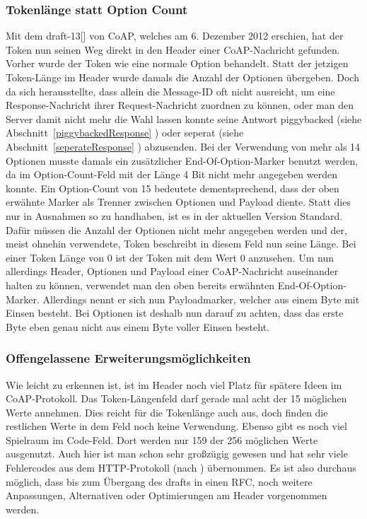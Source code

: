 \subsubsection{Tokenlänge statt Option Count}
Mit dem draft-13[\cite{draft-ietf-core-coap-13}] von CoAP, welches am 6. Dezember 2012 erschien, hat der Token nun seinen Weg direkt in
den Header einer \ac{CoAP}-Nachricht gefunden.
Vorher wurde der Token wie eine normale Option behandelt.
Statt der jetzigen Token-Länge im Header wurde damals die Anzahl der Optionen
übergeben.
Doch da sich herausstellte, dass allein die Message-ID oft nicht ausreicht, um
eine Response-Nachricht ihrer Request-Nachricht zuordnen zu können, oder man den
Server damit nicht mehr die Wahl lassen konnte seine Antwort piggybacked (siehe
Abschnitt~\ref{piggybackedResponse} ) oder seperat
(siehe Abschnitt~\ref{seperateResponse} ) abzusenden.
Bei der Verwendung von mehr als 14 Optionen musste
damals ein zusätzlicher End-Of-Option-Marker benutzt werden, da im
Option-Count-Feld mit der Länge 4 Bit nicht mehr angegeben werden konnte.
Ein Option-Count von 15 bedeutete dementsprechend, dass der oben erwähnte Marker
als Trenner zwischen Optionen und Payload diente.
Statt dies nur in Ausnahmen so zu handhaben, ist es in der aktuellen Version
Standard.
Dafür müssen die Anzahl der Optionen nicht mehr angegeben werden und der, meist
ohnehin verwendete, Token beschreibt in diesem Feld nun seine Länge.
Bei einer Token Länge von 0 ist der Token mit dem Wert 0 anzusehen.
Um nun allerdings Header, Optionen und Payload einer \ac{CoAP}-Nachricht
auseinander halten zu können, verwendet man den oben bereits erwähnten
End-Of-Option-Marker. Allerdings nennt er sich nun Payloadmarker, welcher aus
einem Byte mit Einsen besteht.
Bei Optionen ist deshalb nun darauf zu achten, dass das erste Byte eben genau
nicht aus einem Byte voller Einsen besteht.

\subsubsection{Offengelassene Erweiterungsmöglichkeiten}
Wie leicht zu erkennen ist, ist im Header noch viel Platz für spätere Ideen im \ac{CoAP}-Protokoll.
Das Token-Längenfeld darf gerade mal acht der 15 möglichen Werte annehmen.
Dies reicht für die Tokenlänge auch aus, doch finden die restlichen Werte in dem Feld noch keine
Verwendung.
Ebenso gibt es noch viel Spielraum im Code-Feld.
Dort werden nur 159 der 256 möglichen Werte ausgenutzt.
Auch hier ist man schon sehr großzügig gewesen und hat sehr viele Fehlercodes aus dem
HTTP-Protokoll (nach \cite{rfc2616}) übernommen.
Es ist also durchaus möglich, dass bis zum Übergang des drafts in einen \ac{RFC}, noch weitere
Anpassungen, Alternativen oder Optimierungen am Header vorgenommen werden.
\newpage
